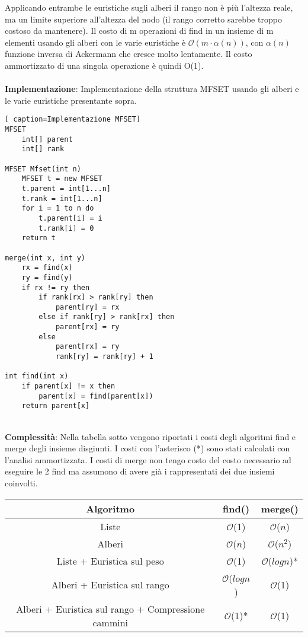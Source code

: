 \documentclass[../cheatSheetAlgoritmi.tex]{subfiles}
\begin{document}
Applicando entrambe le euristiche sugli alberi il rango non è più l'altezza reale, ma un limite superiore all'altezza del nodo (il rango corretto sarebbe troppo costoso da mantenere). Il costo di m operazioni di find in un insieme di m elementi usando gli alberi con le varie euristiche è  $\mathcal{O}(m \cdot \alpha(n))$, con $\alpha(n)$ funzione inversa di Ackermann che cresce molto lentamente. Il costo ammortizzato di una singola operazione è quindi O(1). \\\\
\textbf{Implementazione}: Implementazione della struttura MFSET usando gli alberi e le varie euristiche presentante sopra.\
\begin{lstlisting}[ caption=Implementazione MFSET]
MFSET
	int[] parent
	int[] rank
	
MFSET Mfset(int n)
	MFSET t = new MFSET
	t.parent = int[1...n]
	t.rank = int[1...n]
	for i = 1 to n do
		t.parent[i] = i
		t.rank[i] = 0
	return t
	
merge(int x, int y)
	rx = find(x)
	ry = find(y)
	if rx != ry then
		if rank[rx] > rank[ry] then
			parent[ry] = rx
		else if rank[ry] > rank[rx] then
			parent[rx] = ry
		else
			parent[rx] = ry
			rank[ry] = rank[ry] + 1

int find(int x)
	if parent[x] != x then
		parent[x] = find(parent[x])
	return parent[x]
\end{lstlisting}
\textbf{\\Complessità}: Nella tabella sotto vengono riportati i costi degli algoritmi find e merge degli insieme disgiunti. I costi con l'asterisco (*) sono stati calcolati con l'analisi ammortizzata. I costi di merge non tengo costo del costo necessario ad eseguire le 2 find ma assumono di avere già i rappresentati dei due insiemi coinvolti.\\
\begin{center}
	\renewcommand{\arraystretch}{1.2}
	\begin{tabular}{ |c|c|c| } 
		\hline
			\textbf{Algoritmo} & find() & merge()\\ 
		\hline
			Liste & $\mathcal{O}$(1) &  $\mathcal{O}$($n$)\\ 
		\hline
			Alberi &  $\mathcal{O}$($n$) &  $\mathcal{O}$($n^{2}$) \\
		\hline
			Liste + Euristica sul peso & $\mathcal{O}$(1) &  $\mathcal{O}$($log n$)*\\
		\hline
			Alberi + Euristica sul rango & $\mathcal{O}$($log n$) &  $\mathcal{O}$(1)\\
		\hline
			Alberi + Euristica sul rango + Compressione cammini & $\mathcal{O}$(1)* &  $\mathcal{O}$(1)\\
		\hline
	\end{tabular}
\end{center}
\newpage
\end{document}
